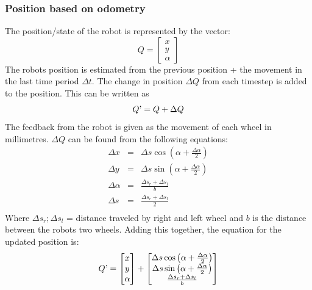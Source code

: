 \subsubsection{Position based on odometry}
The position/state of the robot is represented by the vector: 
\begin{equation}
  Q = 
  \begin{bmatrix}
    x \\
    y \\
    \alpha
  \end{bmatrix}
\end{equation}
The robots position is estimated from the previous position + the movement in the last time period $\Delta t$. The change in position $\Delta Q$ from each timestep is added to the position. This can be written as 
\begin{equation}
  Q\textrm' = Q + \Delta Q
\end{equation}
The feedback from the robot is given as the movement of each wheel in millimetres. $\Delta Q$ can be found from the following equations: 
\begin{eqnarray}
	\Delta x &=& \Delta s \cos \left(\alpha + \frac{\Delta \alpha}{2}\right) \\
	\Delta y &=& \Delta s \sin \left(\alpha + \frac{\Delta \alpha}{2}\right) \\
	\Delta \alpha &=& \frac{\Delta s_r + \Delta s_l}{b} \\
	\Delta s &=& \frac{\Delta s_r + \Delta s_l}{2} \\
\end{eqnarray}
Where $\Delta s_r; \Delta s_l$ = distance traveled by right and left wheel and $b$ is the distance between the robots two wheels. Adding this together, the equation for the updated position is: 
\begin{equation}
  Q\textrm' = 
  \begin{bmatrix}
    x \\
    y \\
    \alpha
  \end{bmatrix}
  +
  \begin{bmatrix}
    \Delta s \cos \left(\alpha + \frac{\Delta \alpha}{2}\right) \\
    \Delta s \sin \left(\alpha + \frac{\Delta \alpha}{2}\right) \\
    \frac{\Delta s_r + \Delta s_l}{b}
  \end{bmatrix}
\end{equation}
